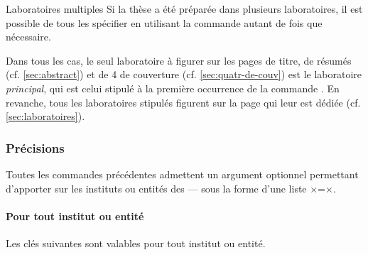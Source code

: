 %
\begin{dbremark}{Laboratoires multiples}{}
  Si la thèse a été préparée dans plusieurs laboratoires, il est possible de
  tous les spécifier en utilisant la commande  autant de
  fois que nécessaire.

  Dans tous les cas, le seul laboratoire à figurer sur les pages de titre, de
  résumés (cf. \vref{sec:abstract}) et de 4\ieme{} de couverture
  (cf. \vref{sec:quatr-de-couv}) est le laboratoire \emph{principal}, qui est
  celui stipulé à la première  occurrence de la
  commande . En revanche, tous les laboratoires stipulés
  figurent sur la page  qui leur est dédiée
  (cf. \vref{sec:laboratoires}).
\end{dbremark}

\subsubsection{Précisions}

Toutes les commandes précédentes admettent un argument optionnel permettant
d'apporter sur les instituts ou entités des  --- sous la forme
d'une liste ×=×.
%
\paragraph{Pour tout institut ou entité}

Les clés suivantes\syntaxeoptions{} sont valables pour tout institut ou entité.


